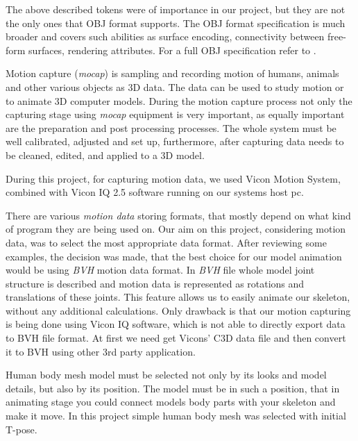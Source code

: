 \documentclass[times, 10pt,twocolumn]{article}
\begin{document}
The above described tokens were of importance in our project, but they are not the only ones that OBJ format supports. The OBJ format specification is much broader and covers such abilities as surface encoding, connectivity between free-form surfaces, rendering attributes. For a full OBJ specification refer to \cite{ex17}.


\label{Motion_capturing_data}

Motion capture (\emph{mocap}) is sampling and recording motion of humans, animals and other various
objects as 3D data. The data can be used to study motion or to animate 3D computer models.
During the motion capture process not only the capturing stage using \emph{mocap} equipment
is very important, as equally important are the preparation and post processing processes.
The whole system must be well calibrated, adjusted and set up, furthermore, after capturing
data needs to be cleaned, edited, and applied to a 3D model.

During this project, for capturing motion data, we used Vicon Motion System,
combined with Vicon IQ 2.5 software running on our systems host pc.


\label{Motion_data}

There are various \emph{motion data} storing formats, that mostly depend on what kind of program they
are being used on. Our aim on this project, considering motion data, was to select
the most appropriate data format. After reviewing some examples, the decision was made,
that the best choice for our model animation would be using \emph{BVH} motion data format.
In \emph{BVH} file whole model joint structure is described and motion data is represented as rotations and translations of these joints. This feature allows us to easily animate our skeleton, without any additional calculations.
Only drawback is that our motion capturing is being done using Vicon IQ software,
which is not able to directly export data to BVH file format. At first we need get Vicons' C3D data file
and then convert it to BVH using other 3rd party application.


\label{Maya_mesh}

Human body mesh model must be selected not only by its looks and model details,
but also by its position. The model must be in such a position, that in
animating stage you could connect models body parts with your skeleton
and make it move. In this project simple human body mesh was selected with initial T-pose.
\end{document}
